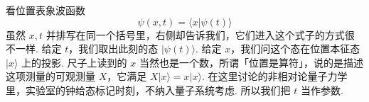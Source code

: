 
看位置表象波函数
\[
\psi(x,t)=\langle x|\psi(t)\rangle
\]
虽然 \(x,t\) 并排写在同一个括号里，右侧却告诉我们，它们进入这个式子的方式很不一样. 给定 \(t\)，我们取出此刻的态 \(|\psi(t)\rangle\). 给定 \(x\)，我们问这个态在位置本征态 \(|x\rangle\) 上的投影. 尺子上读到的 \(x\) 当然也是一个数，所谓「位置是算符」，说的是描述这项测量的可观测量 \(X\)，它满足 \(X|x\rangle=x|x\rangle\). 在这里讨论的非相对论量子力学里，实验室的钟给态标记时刻，不纳入量子系统考虑. 所以我们把 \(t\) 当作参数.

\begin{center}

\end{center}
